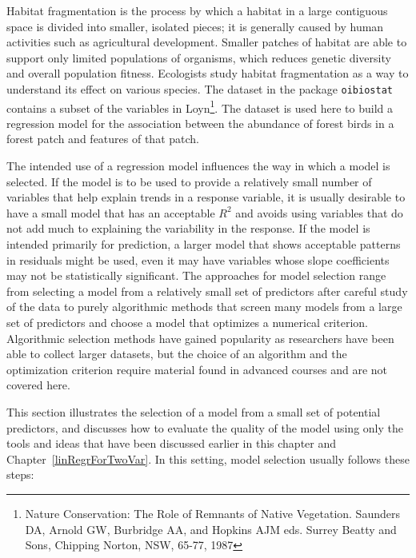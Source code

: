 Habitat fragmentation is the process by which a habitat in a large contiguous space is divided into smaller, isolated pieces; it is generally caused by human activities such as agricultural development. Smaller patches of habitat are able to support only limited populations of organisms, which reduces genetic diversity and overall population fitness.  Ecologists study habitat fragmentation as a way to understand its effect on various species.  The dataset  in the package \texttt{oibiostat} contains a subset of the variables in Loyn\footnote{Nature Conservation: The Role of Remnants of Native Vegetation. Saunders DA, Arnold GW, Burbridge AA, and Hopkins AJM eds. Surrey Beatty and Sons, Chipping Norton, NSW, 65-77, 1987}. The dataset is used here to build a regression model for the association between the abundance of forest birds in a forest patch and features of that patch. 

The intended use of a regression model influences the way in which a model is selected.  If the model is to be used to provide a relatively small number of variables that help explain trends in a response variable, it is usually desirable to have a small model that has an acceptable $R^2$ and avoids using variables that do not add much to explaining the variability in the response.  If the model is intended primarily for prediction, a larger model that shows acceptable patterns in residuals might be used, even it may have variables whose slope coefficients may not be statistically significant. The approaches for model selection range from selecting a model from a relatively small set of predictors after careful study of the data to purely algorithmic methods that screen many models from a large set of predictors and choose a model that optimizes a numerical criterion.  Algorithmic selection methods have gained popularity as researchers have been able to collect larger datasets, but the choice of an algorithm and the optimization criterion require material found in advanced courses and are not covered here.  


This section illustrates the selection of a model from a small set of potential predictors, and discusses how to evaluate the quality of the model using only the tools and ideas that have been discussed earlier in this chapter and Chapter~\ref{linRegrForTwoVar}.  In this setting, model selection usually follows these steps: 


